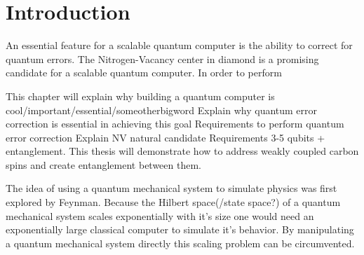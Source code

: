 \chapter{Introduction}



An essential feature for a scalable quantum computer is the ability to correct for quantum errors.
The Nitrogen-Vacancy center in diamond is a promising candidate for a scalable quantum computer.
In order to perform

This chapter will explain why building a quantum computer is cool/important/essential/someotherbigword
Explain why quantum error correction is essential in achieving this goal
Requirements to perform quantum error correction
Explain NV natural candidate
Requirements 3-5 qubits + entanglement.
This thesis will demonstrate how to address weakly coupled carbon spins and create entanglement between them.










The idea of using a quantum mechanical system to simulate physics was first explored by Feynman\cite{Feynman1982Simulating}. Because the Hilbert space(/state space?)  of a quantum mechanical system scales  exponentially with it's size one would need an exponentially large classical computer to simulate it's behavior. By manipulating a quantum mechanical system directly this scaling problem can be circumvented.

